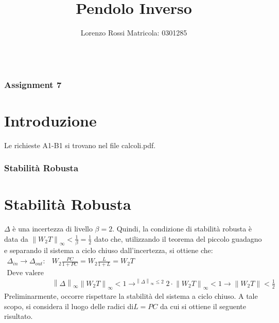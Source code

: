 \documentclass{beamer}
\title[Assignments 7]{Pendolo Inverso}
\author{Lorenzo Rossi Matricola: 0301285}
\begin{document}
\begin{frame}
	\titlepage{}
\end{frame}
\begin{frame}
	\begin{columns}[t]
		\begin{column}{.5\textwidth}
			\tableofcontents[sections={1-3}] %
		\end{column}
		\hspace{-1cm}
		\begin{column}{.5\textwidth}
			\tableofcontents[sections={4-5}] %
		\end{column}
	\end{columns}
\end{frame}
\begin{frame}
	\frametitle{Assignment 7}
	\section{Introduzione}
	Le richieste A1\)-B1\) si trovano nel file calcoli.pdf.
\end{frame}
\begin{frame}
	\frametitle{Stabilità Robusta}%
	\section{Stabilità Robusta}
	\(\Delta \) è una incertezza di livello \(\beta = 2\). Quindi, la condizione di stabilità robusta è data da \(\left\lVert W_{2}T\right\rVert_{\infty}<\frac{1}{\beta}=\frac{1}{2}\) dato che, utilizzando il teorema del piccolo guadagno e separando il sistema a ciclo chiuso dall'incertezza, si ottiene che:
	\begin{align*}
		\Delta_{in}\rightarrow \Delta_{out}: & W_{2}\frac{PC}{1+PC}=W_{2}\frac{L}{1+L}=W_{2}T                                                                                                                                                                                                        \\
		\text{Deve valere che:}                                                                                                                                                                                                                                                                      \\
		                                     & \left\lVert \Delta\right\rVert_{\infty}\left\lVert W_{2}T\right\rVert_{\infty}<1\longrightarrow^{\left\lVert \Delta\right\rVert_{\infty}\leq 2} 2\cdot\left\lVert W_{2}T\right\rVert_{\infty}<1\rightarrow \left\lVert W_{2}T\right\rVert<\frac{1}{2}
	\end{align*}
	Preliminarmente, occorre rispettare la stabilità del sistema a ciclo chiuso. A tale scopo, si considera il luogo delle radici di\(L=PC\) da cui si ottiene il seguente risultato.

\end{frame}
\end{document}
